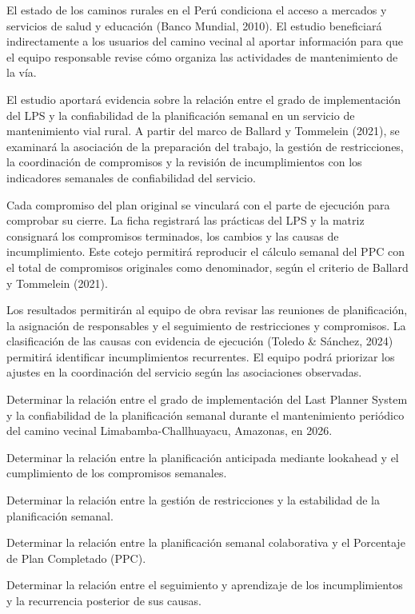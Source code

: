 \documentclass[12pt,a4paper]{article}
\begin{document}
El estado de los caminos rurales en el Perú condiciona el acceso a mercados y servicios de salud y educación (Banco Mundial, 2010). El estudio beneficiará indirectamente a los usuarios del camino vecinal al aportar información para que el equipo responsable revise cómo organiza las actividades de mantenimiento de la vía.

El estudio aportará evidencia sobre la relación entre el grado de implementación del LPS y la confiabilidad de la planificación semanal en un servicio de mantenimiento vial rural. A partir del marco de Ballard y Tommelein (2021), se examinará la asociación de la preparación del trabajo, la gestión de restricciones, la coordinación de compromisos y la revisión de incumplimientos con los indicadores semanales de confiabilidad del servicio.

Cada compromiso del plan original se vinculará con el parte de ejecución para comprobar su cierre. La ficha registrará las prácticas del LPS y la matriz consignará los compromisos terminados, los cambios y las causas de incumplimiento. Este cotejo permitirá reproducir el cálculo semanal del PPC con el total de compromisos originales como denominador, según el criterio de Ballard y Tommelein (2021).

Los resultados permitirán al equipo de obra revisar las reuniones de planificación, la asignación de responsables y el seguimiento de restricciones y compromisos. La clasificación de las causas con evidencia de ejecución (Toledo \& Sánchez, 2024) permitirá identificar incumplimientos recurrentes. El equipo podrá priorizar los ajustes en la coordinación del servicio según las asociaciones observadas.

Determinar la relación entre el grado de implementación del Last Planner System y la confiabilidad de la planificación semanal durante el mantenimiento periódico del camino vecinal Limabamba-Challhuayacu, Amazonas, en 2026.

\begin{listaTrasTitulo}
\item Determinar la relación entre la planificación anticipada mediante lookahead y el cumplimiento de los compromisos semanales.
\item Determinar la relación entre la gestión de restricciones y la estabilidad de la planificación semanal.
\item Determinar la relación entre la planificación semanal colaborativa y el Porcentaje de Plan Completado (PPC).
\item Determinar la relación entre el seguimiento y aprendizaje de los incumplimientos y la recurrencia posterior de sus causas.
\end{listaTrasTitulo}
\end{document}
